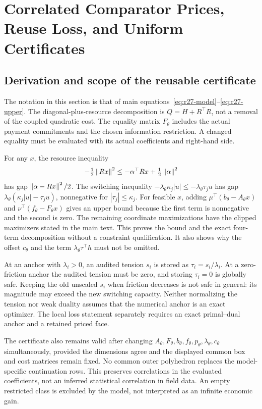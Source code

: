 \section{Correlated Comparator Prices, Reuse Loss, and Uniform Certificates}\label{ec:r27}
\subsection{Derivation and scope of the reusable certificate}
The notation in this section is that of main equations~\eqref{eq:r27-model}--\eqref{eq:r27-upper}. The diagonal-plus-resource decomposition is $Q=H+R^\top R$, not a removal of the coupled quadratic cost. The equality matrix $F_\theta$ includes the actual payment commitments and the chosen information restriction. A changed equality must be evaluated with its actual coefficients and right-hand side.

For any $x$, the resource inequality
\[
 -\tfrac12\left\lVert Rx\right\rVert^2\leq-\alpha^\top Rx+\tfrac12\left\lVert\alpha\right\rVert^2
\]
has gap $\left\lVert\alpha-Rx\right\rVert^2/2$. The switching inequality
$-\lambda_\theta\kappa_j|u|\leq-\lambda_\theta\tau_j u$
has gap $\lambda_\theta(\kappa_j|u|-\tau_j u)$, nonnegative for $|\tau_j|\leq\kappa_j$. For feasible $x$, adding $\mu^\top(b_\theta-A_\theta x)$ and $\nu^\top(f_\theta-F_\theta x)$ gives an upper bound because the first term is nonnegative and the second is zero. The remaining coordinate maximizations have the clipped maximizers stated in the main text. This proves the bound and the exact four-term decomposition without a constraint qualification. It also shows why the offset $c_\theta$ and the term $\lambda_\theta\tau^\top h$ must not be omitted.

At an anchor with $\lambda_i>0$, an audited tension $s_i$ is stored as $\tau_i=s_i/\lambda_i$. At a zero-friction anchor the audited tension must be zero, and storing $\tau_i=0$ is globally safe. Keeping the old unscaled $s_i$ when friction decreases is not safe in general: its magnitude may exceed the new switching capacity. Neither normalizing the tension nor weak duality assumes that the numerical anchor is an exact optimizer. The local loss statement separately requires an exact primal--dual anchor and a retained priced face.

The certificate also remains valid after changing $A_\theta,F_\theta,b_\theta,f_\theta,p_\theta,\lambda_\theta,c_\theta$ simultaneously, provided the dimensions agree and the displayed common box and cost matrices remain fixed. No common outer polyhedron replaces the model-specific continuation rows. This preserves correlations in the evaluated coefficients, not an inferred statistical correlation in field data. An empty restricted class is excluded by the model, not interpreted as an infinite economic gain.

